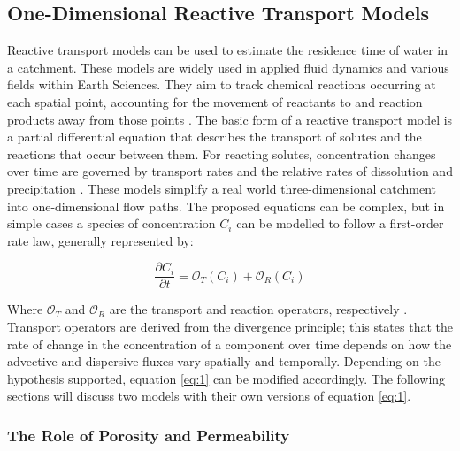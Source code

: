 \subsection{One-Dimensional Reactive Transport Models}

Reactive transport models can be used to estimate the residence time of water in a catchment. These models are widely used in applied fluid dynamics and various fields within Earth Sciences. They aim to track chemical reactions occurring at each spatial point, accounting for the movement of reactants to and reaction products away from those points \parencite{bethkeGEOCHEMICALBIOGEOCHEMICALREACTION}. The basic form of a reactive transport model is a partial differential equation that describes the transport of solutes and the reactions that occur between them. For reacting solutes, concentration changes over time are governed by transport rates and the relative rates of dissolution and precipitation \parencite{bethkeGEOCHEMICALBIOGEOCHEMICALREACTION}.
These models simplify a real world three-dimensional catchment into one-dimensional flow paths. The proposed equations can be complex, but in simple cases a species of concentration $C_i$ can be modelled to follow a first-order rate law, generally represented by:

\begin{equation}
    \frac{\partial C_i}{\partial t} = \mathcal{O}_{T}(C_i) + \mathcal{O}_{R}(C_i)
    \label{eq:1}
\end{equation}


Where \(\mathcal{O}_{T}\) and \(\mathcal{O}_{R}\) are the transport and reaction operators, respectively \parencite{bethkeGEOCHEMICALBIOGEOCHEMICALREACTION}. Transport operators are derived from the divergence principle; this states that the rate of change in the concentration of a component over time depends on how the advective and dispersive fluxes vary spatially and temporally. Depending on the hypothesis supported, equation \ref{eq:1} can be modified accordingly. The following sections will discuss two models with their own versions of equation \ref{eq:1}.

\subsubsection*{The Role of Porosity and Permeability}

